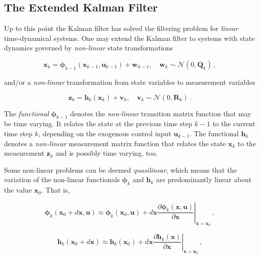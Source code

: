 \subsection{The Extended Kalman Filter}

Up to this point the Kalman filter has solved the filtering problem for \emph{linear} time-dynamical systems. One may extend the Kalman filter to systems with state dynamics governed by \emph{non-linear} state transformations

\begin{equation}\label{eq:time_dynamical_system_plant_extended}
  \bm{x}_k = \bm{\phi}_{k-1}(\bm{x}_{k-1}, \bm{u}_{k-1})+\bm{w}_{k-1}, \quad \bm{w}_{k} \sim \mathcal{N}(0,\bm{Q}_k)\,,
\end{equation}

\noindent
and/or a \emph{non-linear} transformation from state variables to measurement variables

\begin{equation}\label{eq:time_dynamical_system_measurement_extended}
  \bm{z}_k = \bm{h}_{k}(\bm{x}_{k})+\bm{v}_{k}, \quad \bm{v}_{k} \sim \mathcal{N}(0,\bm{R}_k)\,.
\end{equation}

\noindent
The \emph{functional} $\bm{\phi}_{k-1}$ denotes the \emph{non-linear} transition matrix function that may be time varying. It relates the state at the previous time step $k-1$ to the current time step $k$, depending on the exogenous control input $\bm{u}_{k-1}$. The functional $\bm{h}_{k}$ denotes a \emph{non-linear} measurement matrix function that relates the state $\bm{x}_{k}$ to the measurement $\bm{z}_k$ and is possibly time varying, too.

Some non-linear problems can be deemed \emph{quasilinear}, which means that the variation of the non-linear functionals $\bm{\phi}_k$ and $\bm{h}_k$ are predominantly linear about the value $\bm{x}_0$. That is,

\begin{equation}\label{eq:linear_phi}
  \bm{\phi}_{k}(\bm{x}_0 + d \bm{x}, \bm{u}) \approx \bm{\phi}_{k}(\bm{x}_0, \bm{u}) + d \bm{x} \left. \frac{\partial \bm{\phi}_{k}(\bm{x}, \bm{u})}{\partial \bm{x}} \right|_{\bm{x} = \bm{x}_0}\,,
\end{equation}

\begin{equation}\label{eq:linear_h}
  \bm{h}_{k}(\bm{x}_0 + d \bm{x}) \approx \bm{h}_{k}(\bm{x}_0) + d \bm{x} \left. \frac{\partial \bm{h}_{k}(\bm{x})}{\partial \bm{x}} \right|_{\bm{x} = \bm{x}_0}\,,
\end{equation}

